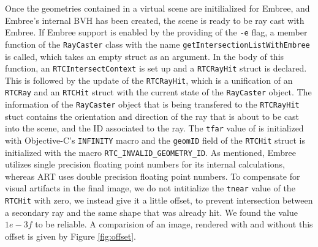 Once the geometries contained in a virtual scene are initilialized for Embree, and Embree's internal BVH has been created, the scene is ready to be ray cast with Embree. If Embree support is enabled by the providing of the \texttt{-e} flag, a member function of the \texttt{RayCaster} class with the name \texttt{getIntersectionListWithEmbree} is called, which takes an empty  struct  as an argument. In the body of this function, an \texttt{RTCIntersectContext}  is set up and a \texttt{RTCRayHit} struct is declared.
This is followed by the update of the \texttt{RTCRayHit}, which is a unification of an \texttt{RTCRay} and an \texttt{RTCHit} struct with the current state of the \texttt{RayCaster} object. The information of the \texttt{RayCaster} object that is being transfered to the \texttt{RTCRayHit} stuct contains the orientation and direction of the ray that is about to be cast into the scene, and the ID associated to the ray. The \texttt{tfar} value of is initialized with Objective-C's \texttt{INFINITY} macro and the \texttt{geomID} field of the \texttt{RTCHit} struct is initialized with the macro \texttt{RTC\_INVALID\_GEOMETRY\_ID}. As mentioned,  Embree utilizes single precision floating point numbers for its internal calculations, whereas ART uses double precision floating point numbers. To compensate for visual artifacts in the final image, we do not intitialize the \texttt{tnear} value of the \texttt{RTCHit} with zero, we instead give it a little offset, to prevent intersection between a secondary ray and the same shape that was already hit. We found the value $1e-3f$ to be reliable. A comparision of an image, rendered with and without this offset is given by Figure \ref{fig:offset}.

